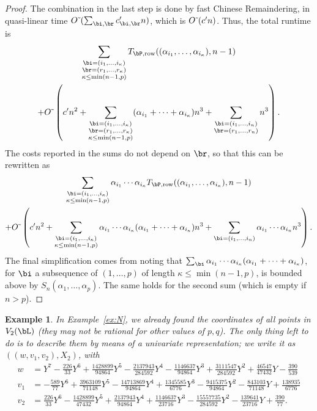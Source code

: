 \documentclass[12pt]{article}
\newtheorem{example}[definition]{Example}
\begin{document}
\begin{proof}
  The combination in the last step is done by fast Chinese Remaindering,
  in quasi-linear time $\softO(\sum_{\bi,\br} c'_{\bi,\br}  n)$,
  which is ${O}{\,\tilde{ }\,}({c'}{} n)$. Thus, the total runtime is 
  \begin{multline*}
 \sum_{\substack{\bi=(i_1,\dots,i_\kappa)\\ \br=(r_1,\dots,r_\kappa)\\\kappa\le\min(n-1,p)}}
T_{\bP,{\rm row}}((\alpha_{i_1},\dots,\alpha_{i_\kappa}), n-1)\\
+\softO\left (\rc n^2  + \sum_{\substack{\bi=(i_1,\dots,i_\kappa)\\ \br=(r_1,\dots,r_\kappa)\\\kappa\le\min(n-1,p)}}
  (\alpha_{i_1} + \cdots +\alpha_{i_\kappa}) n^3 
  +  \sum_{\substack{\bi=(i_1,\dots,i_n)\\ \br=(r_1,\dots,r_n)}} n^3\right).    
  \end{multline*}
  The costs reported in the sums do not depend on $\br$, so that 
  this can be rewritten as 
  \begin{multline*}
 \sum_{\substack{\bi=(i_1,\dots,i_\kappa)\\ \kappa\le\min(n-1,p)}}
  \alpha_{i_1}  \cdots \alpha_{i_\kappa}T_{\bP,{\rm row}}((\alpha_{i_1},\dots,\alpha_{i_\kappa}), n-1)\\
+\softO\left ( \rc n^2 + \sum_{\substack{\bi=(i_1,\dots,i_\kappa)\\ \kappa\le\min(n-1,p)}}
    \alpha_{i_1}  \cdots \alpha_{i_\kappa} (\alpha_{i_1} + \cdots +\alpha_{i_\kappa}) n^3 
  +  \sum_{\substack{\bi=(i_1,\dots,i_n)}   }\alpha_{i_1}  \cdots \alpha_{i_n} n^3\right).    
  \end{multline*}
  The final simplification comes from noting that $\sum_{\bi}
  \alpha_{i_1} \cdots \alpha_{i_\kappa}(\alpha_{i_1} + \cdots
  +\alpha_{i_\kappa})$, for $\bi$ a subsequence of $(1,\dots,p)$ of
  length $\kappa\le\min(n-1,p)$, is bounded  above by
  $S_n(\alpha_1,\dots,\alpha_p)$. The same holds for the second
  sum (which is empty if $n >p$).
\end{proof}


\begin{example}\label{ex:Npar}
  In Example~\ref{ex:N}, we already found the coordinates of all
  points in $V_2(\bL)$ (they may not be rational for other values of
  $p,q$).  The only thing left to do is to describe them by means of a
  univariate representation; we write it as $((w,v_1,v_2),X_2)$, with
{\small  \begin{align*}
w &=Y^7 - \frac{226}{33}Y^6 + \frac{1428899}{94864}Y^5 - \frac{2137943}{284592}Y^4 - \frac{1146637}{94864}Y^3 + 
    \frac{3111547}{284592}Y^2 + \frac{46547}{47432}Y - \frac{390}{539} \\[1mm]
v_1&= -\frac{589}{77}Y^6 + \frac{3963109}{71148}Y^5 - \frac{14713869}{94864}Y^4 + \frac{1345585}{6776}Y^3 - 
    \frac{9415375}{94864}Y^2 - \frac{843103}{71148}Y + \frac{138935}{6776}\\[1mm]
v_2 &=\frac{226}{33}Y^6 - \frac{1428899}{47432}Y^5 + \frac{2137943}{94864}Y^4 + \frac{1146637}{23716}Y^3 - 
\frac{15557735}{284592}Y^2 - \frac{139641}{23716}Y + \frac{390}{77}.
  \end{align*}}
\end{example}
\end{document}
